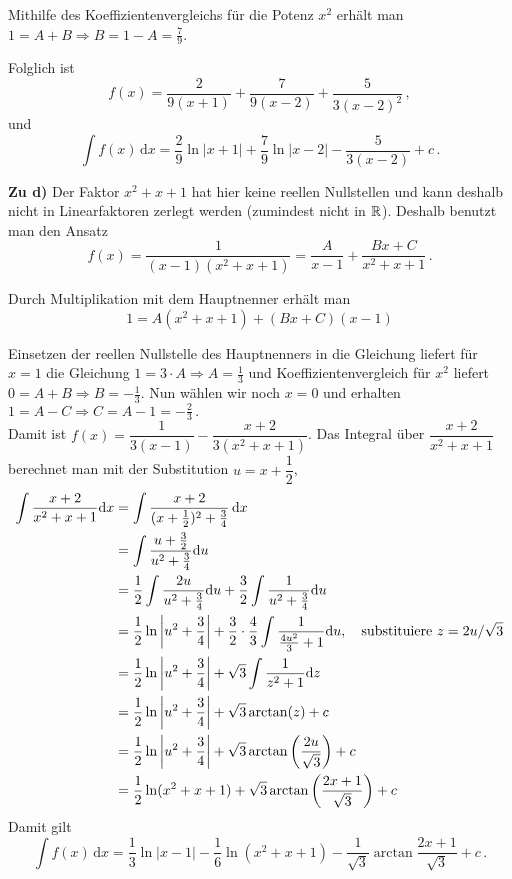 {Mithilfe des Koeffizientenvergleichs f\"ur die Potenz \(x^2\) erh\"alt man \(1 = A+ B \Rightarrow B = 1- A = \frac79\).
 
Folglich ist 
\[f(x)=\frac{2}{9(x+1)}+\frac{7}{9(x-2)} +\frac{5}{3(x-2)^2}\,, \] 
und
\[\int f(x) \,\mathrm{d} x=\frac{2}{9} \ln |x+1| +\frac{7}{9} \ln|x-2|
  - \frac{5}{3(x-2)} + c\,.\]

\bigskip
\textbf{Zu d)} Der Faktor $x^2+x+1$ hat hier keine reellen Nullstellen und kann
deshalb nicht in Linearfaktoren zerlegt werden (zumindest nicht in $\mathbb{R}$).
Deshalb benutzt man den Ansatz
\[ f(x)=\dfrac{1}{(x-1)(x^2+x+1)} = \dfrac{A}{x-1} + \dfrac{Bx+C}{x^2+x+1}\,.\]

Durch Multiplikation mit dem Hauptnenner erh\"alt man
\[ 1 = A(x^2+x+1)+(Bx+C)(x-1)\]

Einsetzen der reellen Nullstelle des Hauptnenners in die Gleichung liefert 
f\"ur \(x=1\) die Gleichung \(1 = 3\cdot A \Rightarrow A = \frac13\) und Koeffizientenvergleich f\"ur \(x^2\) liefert \(0 = A+B \Rightarrow B = -\frac13\). Nun w\"ahlen wir noch \(x = 0\) und erhalten \( 1=A-C  \Rightarrow C =A-1=-\frac23\,.\)\\

Damit ist
$f(x)= \dfrac{1}{3(x-1)}-\dfrac{x+2}{3(x^2+x+1)}$. 
Das Integral \"uber $\dfrac{x+2}{x^2+x+1}$ berechnet man mit der 
Substitution $u=x+\dfrac{1}{2}$, 
\begin{align*}
\int \dfrac{x+2}{x^2+x+1} \mathrm{d} x & = \int \dfrac{x+2}{(x+\frac 12)^2 + \frac34} \,\mathrm{d} x \\
  & = \int \dfrac{u+\frac{3}{2}}{u^2+\frac{3}{4}} \mathrm{d} u \\
  & = \frac 12 \int \frac{2u}{u^2+\frac 34}\mathrm{d} u + \frac 32 \int\frac{1}{u^2+\frac 34}\mathrm{d} u \\
  & = \frac 12 \ln \left|u^2+\frac 34\right| + \frac 32 \cdot \frac 43\int \frac 1{\frac{4u^2}3+1}\mathrm{d}  u, \quad \text{substituiere }z=2u/\sqrt 3\\
  & = \frac 12 \ln \left|u^2+\frac 34\right| + \sqrt 3\int \frac 1{z^2+1}\mathrm{d} z\\
  & = \frac 12 \ln \left|u^2+\frac 34\right| + \sqrt 3\arctan(z) + c\\
  & = \dfrac{1}{2} \ln\left|u^2+\frac{3}{4}\right| + \sqrt{3}
   \arctan  \left(\frac{2u}{\sqrt3}  \right) + c \\
  & = \frac 12 \ln(x^2+x+1) + \sqrt3 \arctan\left(\dfrac{2x+1}{\sqrt3}\right) + c
\end{align*}
Damit gilt
\[ \int f(x)\,\mathrm{d} x=\dfrac{1}{3} \ln |x-1|-\dfrac{1}{6} \ln (x^2+x+1)
   - \dfrac{1}{\sqrt{3}} \arctan \dfrac{2x+1}{\sqrt{3}} + c\,.\]
}

